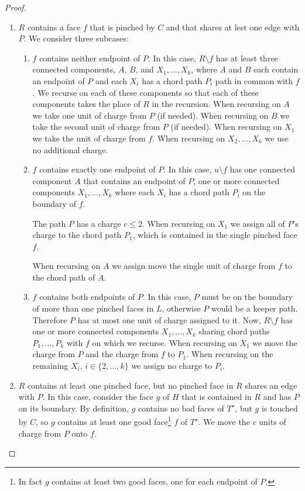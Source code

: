 \documentclass{patmorin}
\newcommand{\dual}[1]{{#1}^\star}
\begin{document}
\begin{proof}
\begin{enumerate}
     \item $R$ contains a face $f$ that is pinched by $C$ and that shares
     at lest one edge with $P$.  We consider three subcases:
     \begin{enumerate}
        \item $f$ contains neither endpoint of $P$. In this case,
        $R\setminus f$ has at least three connected components, $A$,
        $B$, and $X_1,\ldots,X_k$, where $A$ and $B$ each contain an
        endpoint of $P$ and each $X_i$ has a chord path $P_i$ path in
        common with $f$.  We recurse on each of these components so
        that each of these components takes the place of $R$ in the
        recursion. When recursing on $A$ we take one unit of charge
        from $P$ (if needed).  When recursing on $B$ we take the second
        unit of charge from $P$ (if needed).  When recursing on $X_1$ we
        take the unit of charge from $f$. When recursing on $X_2,\ldots,X_k$
        we use no additional charge.

	\item $f$ contains exactly one endpoint of $P$.  In this case,
	$u\setminus f$ has one connected component $A$ that contains an
	endpoint of $P$, one or more connected components $X_1,\ldots,X_k$
	where each $X_i$ has a chord path $P_i$ on the boundary of $f$.

	The path $P$ has a charge $c\le 2$.  When recursing on $X_1$ we
	assign all of $P$'s charge to the chord path $P_1$, which is contained
        in the single pinched face $f$.
		     
	When recursing on $A$ we assign move the single unit of charge
	from $f$ to the chord path of $A$.

        \item $f$ contains both endpoints of $P$.  In this case, $P$ must
        be on the boundary of more than one pinched faces in $L$, otherwise $P$
        would be a keeper path. Therefore $P$
        has at most one unit of charge assigned to it.  Now, $R\setminus
        f$ has one or more connected components $X_1,\ldots,X_k$ sharing
        chord paths $P_1,\ldots,P_k$ with $f$ on which we recurse.
        When recursing on $X_1$ we move the charge from $P$ and the
        charge from $f$ to $P_1$.  When recursing on the remaining $X_i$,
        $i\in\{2,\ldots,k\}$ we assign no charge to $P_i$.
  \end{enumerate}
  \item $R$ contains at least one pinched face, but no pinched face in $R$
  shares an edge with $P$.  In this case, consider the face $g$ of $H$
  that is contained in $R$ and has $P$ on its boundary. By definition,
  $g$ contains no bad faces of $\dual{T}$, but $g$ is touched by $C$,
  so $g$ contains at least one good face\footnote{In fact $g$ contains at
  least two good faces, one for each endpoint of $P$.} $f$ of $\dual{T}$.
  We move the $c$ units of charge from $P$ onto $f$.


\end{enumerate}
\end{proof}
\end{document}
